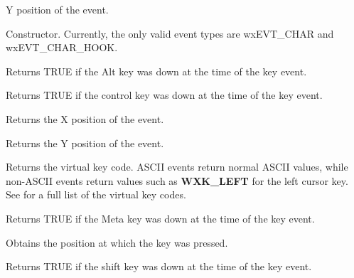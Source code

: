 
Y position of the event.



Constructor. Currently, the only valid event types are wxEVT\_CHAR and wxEVT\_CHAR\_HOOK.



Returns TRUE if the Alt key was down at the time of the key event.



Returns TRUE if the control key was down at the time of the key event.



Returns the X position of the event.



Returns the Y position of the event.



Returns the virtual key code. ASCII events return normal ASCII values,
while non-ASCII events return values such as {\bf WXK\_LEFT} for the
left cursor key. See  for a full list of the virtual key codes.



Returns TRUE if the Meta key was down at the time of the key event.



Obtains the position at which the key was pressed.



Returns TRUE if the shift key was down at the time of the key event.


